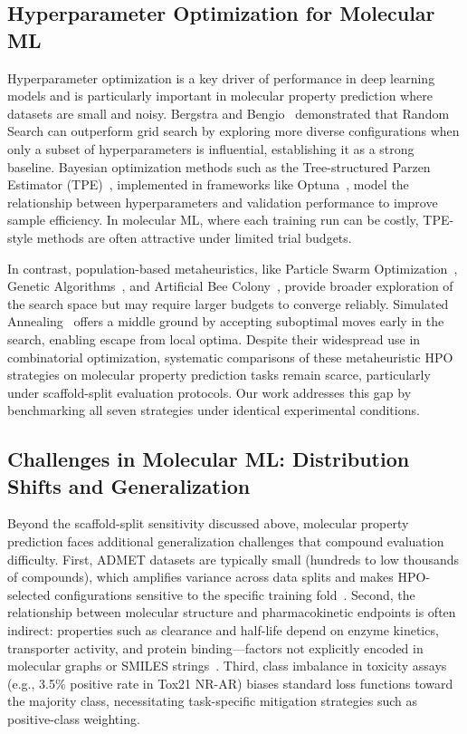 \documentclass[12pt]{article}
\begin{document}
\subsection{Hyperparameter Optimization for Molecular ML}

Hyperparameter optimization is a key driver of performance in deep learning models and is particularly important in molecular property prediction where datasets are small and noisy. Bergstra and Bengio~\cite{bergstra2012random} demonstrated that Random Search can outperform grid search by exploring more diverse configurations when only a subset of hyperparameters is influential, establishing it as a strong baseline. Bayesian optimization methods such as the Tree-structured Parzen Estimator (TPE)~\cite{bergstra2011tpe}, implemented in frameworks like Optuna~\cite{akiba2019optuna}, model the relationship between hyperparameters and validation performance to improve sample efficiency. In molecular ML, where each training run can be costly, TPE-style methods are often attractive under limited trial budgets.

In contrast, population-based metaheuristics, like Particle Swarm Optimization~\cite{kennedy1995pso}, Genetic Algorithms~\cite{holland1975ga}, and Artificial Bee Colony~\cite{karaboga2005abc}, provide broader exploration of the search space but may require larger budgets to converge reliably. Simulated Annealing~\cite{saopt} offers a middle ground by accepting suboptimal moves early in the search, enabling escape from local optima. Despite their widespread use in combinatorial optimization, systematic comparisons of these metaheuristic HPO strategies on molecular property prediction tasks remain scarce, particularly under scaffold-split evaluation protocols. Our work addresses this gap by benchmarking all seven strategies under identical experimental conditions.


\subsection{Challenges in Molecular ML: Distribution Shifts and Generalization}
Beyond the scaffold-split sensitivity discussed above, molecular property prediction faces additional generalization challenges that compound evaluation difficulty. First, ADMET datasets are typically small (hundreds to low thousands of compounds), which amplifies variance across data splits and makes HPO-selected configurations sensitive to the specific training fold~\cite{wu2018moleculenet}. Second, the relationship between molecular structure and pharmacokinetic endpoints is often indirect: properties such as clearance and half-life depend on enzyme kinetics, transporter activity, and protein binding---factors not explicitly encoded in molecular graphs or SMILES strings~\cite{obach1999prediction}. Third, class imbalance in toxicity assays (e.g., 3.5\% positive rate in Tox21 NR-AR) biases standard loss functions toward the majority class, necessitating task-specific mitigation strategies such as positive-class weighting.
\end{document}
